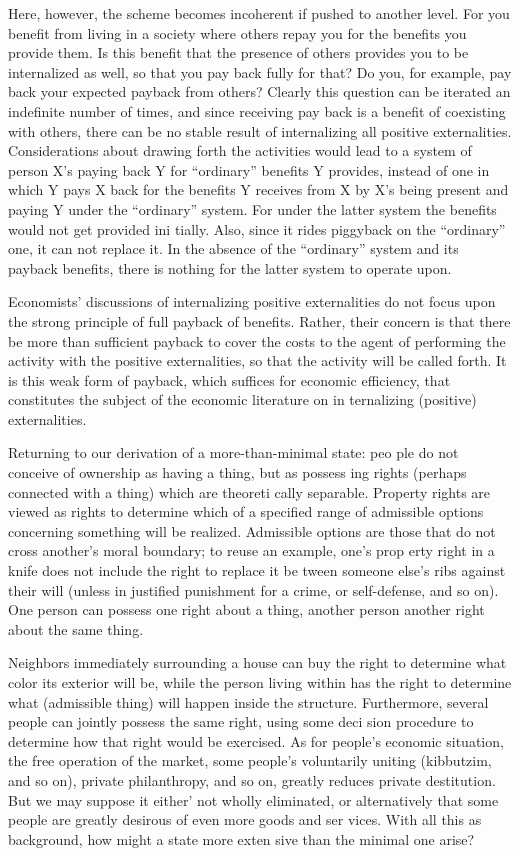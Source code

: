 \documentclass[11pt,openany]{book}
\begin{document}
Here, however, the scheme becomes incoherent if pushed to another level. For you benefit from living in a society where others repay you for the benefits you provide them. Is this benefit that the presence of others provides you to be internalized as well, so that you pay back fully for that? Do you, for example, pay back your expected payback from others? Clearly this question can be iterated an indefinite number of times, and since receiving pay back is a benefit of coexisting with others, there can be no stable result of internalizing all positive externalities. Considerations about drawing forth the activities would lead to a system of person X's paying back Y for ``ordinary'' benefits Y provides, instead of one in which Y pays X back for the benefits Y receives from X by X's being present and paying Y under the ``ordinary'' system. For under the latter system the benefits would not get provided ini tially. Also, since it rides piggyback on the ``ordinary'' one, it can not replace it. In the absence of the ``ordinary'' system and its payback benefits, there is nothing for the latter system to operate upon. 

Economists' discussions of internalizing positive externalities do not focus upon the strong principle of full payback of benefits. Rather, their concern is that there be more than sufficient payback to cover the costs to the agent of performing the activity with the positive externalities, so that the activity will be called forth. It is this weak form of payback, which suffices for economic efficiency, that constitutes the subject of the economic literature on in ternalizing (positive) externalities. 

Returning to our derivation of a more-than-minimal state: peo ple do not conceive of ownership as having a thing, but as possess ing rights (perhaps connected with a thing) which are theoreti cally separable. Property rights are viewed as rights to determine which of a specified range of admissible options concerning something will be realized. Admissible options are those that do not cross another's moral boundary; to reuse an example, one's prop erty right in a knife does not include the right to replace it be tween someone else's ribs against their will (unless in justified punishment for a crime, or self-defense, and so on). One person can possess one right about a thing, another person another right about the same thing. 

Neighbors immediately surrounding a house can buy the right to determine what color its exterior will be, while the person living within has the right to determine what (admissible thing) will happen inside the structure. Furthermore, several people can jointly possess the same right, using some deci sion procedure to determine how that right would be exercised. As for people's economic situation, the free operation of the market, some people's voluntarily uniting (kibbutzim, and so on), private philanthropy, and so on, greatly reduces private destitution. But we may suppose it either' not wholly eliminated, or alternatively that some people are greatly desirous of even more goods and ser vices. With all this as background, how might a state more exten sive than the minimal one arise? 
\end{document}
